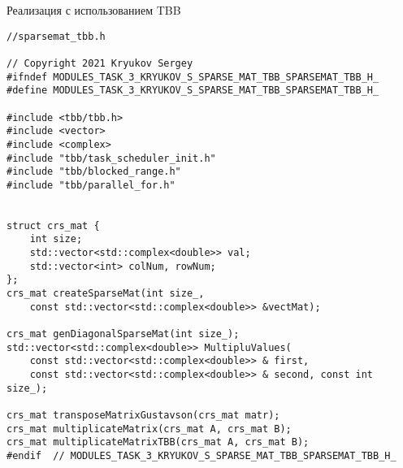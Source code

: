 \documentclass{report}
\begin{document}
\par Реализация с использованием TBB
\begin{lstlisting}
//sparsemat_tbb.h

// Copyright 2021 Kryukov Sergey
#ifndef MODULES_TASK_3_KRYUKOV_S_SPARSE_MAT_TBB_SPARSEMAT_TBB_H_
#define MODULES_TASK_3_KRYUKOV_S_SPARSE_MAT_TBB_SPARSEMAT_TBB_H_

#include <tbb/tbb.h>
#include <vector>
#include <complex>
#include "tbb/task_scheduler_init.h"
#include "tbb/blocked_range.h"
#include "tbb/parallel_for.h"


struct crs_mat {
    int size;
    std::vector<std::complex<double>> val;
    std::vector<int> colNum, rowNum;
};
crs_mat createSparseMat(int size_,
    const std::vector<std::complex<double>> &vectMat);

crs_mat genDiagonalSparseMat(int size_);
std::vector<std::complex<double>> MultipluValues(
    const std::vector<std::complex<double>> & first,
    const std::vector<std::complex<double>> & second, const int size_);

crs_mat transposeMatrixGustavson(crs_mat matr);
crs_mat multiplicateMatrix(crs_mat A, crs_mat B);
crs_mat multiplicateMatrixTBB(crs_mat A, crs_mat B);
#endif  // MODULES_TASK_3_KRYUKOV_S_SPARSE_MAT_TBB_SPARSEMAT_TBB_H_
\end{lstlisting}
\end{document}
